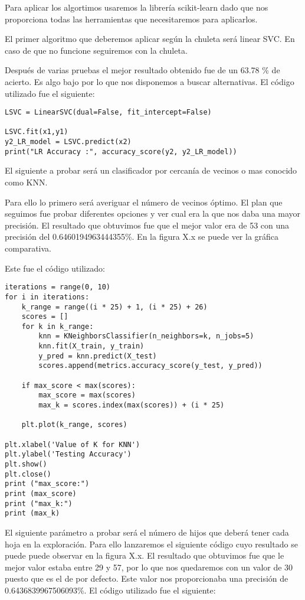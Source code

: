 Para aplicar los algortimos usaremos la librería scikit-learn dado que nos proporciona
todas las herramientas que necesitaremos para aplicarlos.

El primer algoritmo que deberemos aplicar según la chuleta será linear SVC. En caso
de que no funcione seguiremos con la chuleta.

Después de varias pruebas el mejor resultado obtenido fue de un 63.78 \% de acierto. Es
algo bajo por lo que nos disponemos a buscar alternativas. El código utilizado fue el siguiente:

\begin{lstlisting}
LSVC = LinearSVC(dual=False, fit_intercept=False)

LSVC.fit(x1,y1)
y2_LR_model = LSVC.predict(x2)
print("LR Accuracy :", accuracy_score(y2, y2_LR_model))
\end{lstlisting}

El siguiente a probar será un clasificador por cercanía de vecinos o mas conocido como KNN.

Para ello lo primero será averiguar el número de vecinos óptimo. El plan que seguimos
fue probar diferentes opciones y ver cual era la que nos daba una mayor precisión. El resultado
que obtuvimos fue que el mejor valor era de 53 con una precisión del 0.6460194963444355\%.
En la figura X.x se puede ver la gráfica comparativa.

Este fue el código utilizado:

\begin{lstlisting}
iterations = range(0, 10)
for i in iterations:
    k_range = range((i * 25) + 1, (i * 25) + 26)
    scores = []
    for k in k_range:
        knn = KNeighborsClassifier(n_neighbors=k, n_jobs=5)
        knn.fit(X_train, y_train)
        y_pred = knn.predict(X_test)
        scores.append(metrics.accuracy_score(y_test, y_pred))

    if max_score < max(scores):
        max_score = max(scores)
        max_k = scores.index(max(scores)) + (i * 25)

    plt.plot(k_range, scores)

plt.xlabel('Value of K for KNN')
plt.ylabel('Testing Accuracy')
plt.show()
plt.close()
print ("max_score:")
print (max_score)
print ("max_k:")
print (max_k)
\end{lstlisting}

El siguiente parámetro a probar será el número de hijos que deberá tener
cada hoja en la exploración. Para ello lanzaremos el siguiente código cuyo
resultado se puede puede observar en la figura X.x. El resultado que obtuvimos
fue que le mejor valor estaba entre 29 y 57, por lo que nos quedaremos con un valor
de 30 puesto que es el de por defecto. Este valor nos proporcionaba una precisión
de 0.6436839967506093\%. El código utilizado fue el siguiente:


